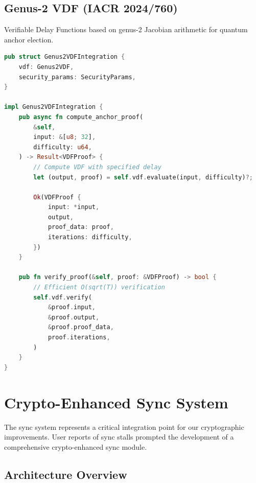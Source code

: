 \documentclass[11pt,a4paper]{article}
\begin{document}
\subsection{Genus-2 VDF (IACR 2024/760)}

Verifiable Delay Functions based on genus-2 Jacobian arithmetic for quantum anchor election.

\begin{lstlisting}[language=Rust, caption=Genus-2 VDF Integration]
pub struct Genus2VDFIntegration {
    vdf: Genus2VDF,
    security_params: SecurityParams,
}

impl Genus2VDFIntegration {
    pub async fn compute_anchor_proof(
        &self,
        input: &[u8; 32],
        difficulty: u64,
    ) -> Result<VDFProof> {
        // Compute VDF with specified delay
        let (output, proof) = self.vdf.evaluate(input, difficulty)?;

        Ok(VDFProof {
            input: *input,
            output,
            proof_data: proof,
            iterations: difficulty,
        })
    }

    pub fn verify_proof(&self, proof: &VDFProof) -> bool {
        // Efficient O(sqrt(T)) verification
        self.vdf.verify(
            &proof.input,
            &proof.output,
            &proof.proof_data,
            proof.iterations,
        )
    }
}
\end{lstlisting}

\section{Crypto-Enhanced Sync System}

The sync system represents a critical integration point for our cryptographic improvements. User reports of sync stalls prompted the development of a comprehensive crypto-enhanced sync module.

\subsection{Architecture Overview}
\end{document}
